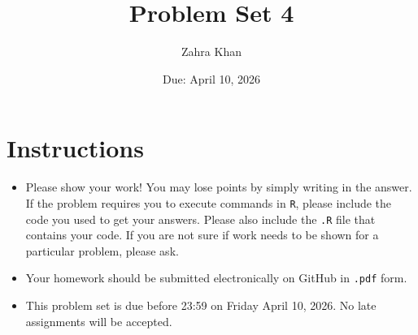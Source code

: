 \documentclass[12pt,letterpaper]{article}
\title{Problem Set 4}
\date{Due: April 10, 2026}
\author{Zahra Khan}
\begin{document}
	\maketitle
	\section*{Instructions}
	\begin{itemize}
	\item Please show your work! You may lose points by simply writing in the answer. If the problem requires you to execute commands in \texttt{R}, please include the code you used to get your answers. Please also include the \texttt{.R} file that contains your code. If you are not sure if work needs to be shown for a particular problem, please ask.
	\item Your homework should be submitted electronically on GitHub in \texttt{.pdf} form.
	\item This problem set is due before 23:59 on Friday April 10, 2026. No late assignments will be accepted.

	\end{itemize}

	\vspace{.25cm}
\end{document}
